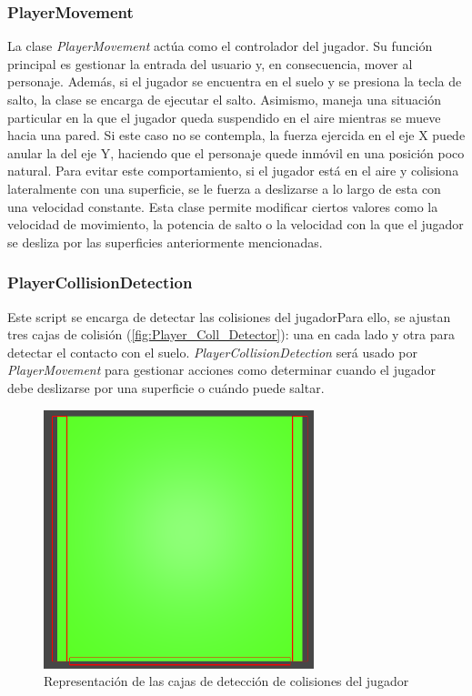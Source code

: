 \subsubsection{PlayerMovement}

La clase \textit{PlayerMovement} actúa como el controlador del jugador. Su función principal es gestionar la entrada del usuario y, en consecuencia, mover al personaje. Además, si el jugador se encuentra en el suelo y se presiona la tecla de salto, la clase se encarga de ejecutar el salto.
Asimismo, maneja una situación particular en la que el jugador queda suspendido en el aire mientras se mueve hacia una pared. Si este caso no se contempla, la fuerza ejercida en el eje X puede anular la del eje Y, haciendo que el personaje quede inmóvil en una posición poco natural. Para evitar este comportamiento, si el jugador está en el aire y colisiona lateralmente con una superficie, se le fuerza a deslizarse a lo largo de esta con una velocidad constante.
Esta clase permite modificar ciertos valores como la velocidad de movimiento, la potencia de salto o la velocidad con la que el jugador se desliza por las superficies anteriormente mencionadas.\\

\subsubsection{PlayerCollisionDetection}

Este script se encarga de detectar las colisiones del jugadorPara ello, se ajustan tres cajas de colisión (\autoref{fig:Player_Coll_Detector}): una en cada lado y otra para detectar el contacto con el suelo.
\textit{PlayerCollisionDetection} será usado por \textit{PlayerMovement} para gestionar acciones como determinar cuando el jugador debe deslizarse por una superficie o cuándo puede saltar.\\

\begin{figure}[t]
	\centering
	\includegraphics[width = 0.7\textwidth]{Imagenes/CollDetector.png}
	\caption{Representación de las cajas de detección de colisiones del jugador}
	\label{fig:Player_Coll_Detector}
\end{figure}
